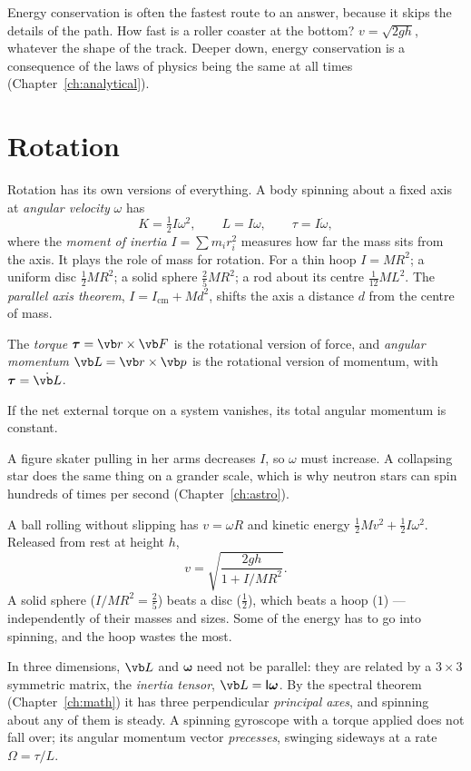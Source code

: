 Energy conservation is often the fastest route to an answer, because it skips the details of the path. How fast is a roller coaster at the bottom? $v = \sqrt{2gh}$, whatever the shape of the track. Deeper down, energy conservation is a consequence of the laws of physics being the same at all times (Chapter~\ref{ch:analytical}).

\section{Rotation}

Rotation has its own versions of everything. A body spinning about a fixed axis at \emph{angular velocity} $\omega$ has
\[
  K = \tfrac12 I\omega^{2},\qquad L = I\omega,\qquad \tau = I\dot\omega,
\]
where the \emph{moment of inertia} $I = \sum m_i r_i^2$ measures how far the mass sits from the axis. It plays the role of mass for rotation. For a thin hoop $I = MR^2$; a uniform disc $\tfrac12 MR^2$; a solid sphere $\tfrac25 MR^2$; a rod about its centre $\tfrac1{12}ML^2$. The \emph{parallel axis theorem}, $I = I_{\text{cm}} + Md^2$, shifts the axis a distance $d$ from the centre of mass.

The \emph{torque} $\boldsymbol\tau = \vb r\times\vb F$ is the rotational version of force, and \emph{angular momentum} $\vb L = \vb r\times\vb p$ is the rotational version of momentum, with $\boldsymbol\tau = \dot{\vb L}$.

\begin{law}
If the net external torque on a system vanishes, its total angular momentum is constant.
\end{law}

A figure skater pulling in her arms decreases $I$, so $\omega$ must increase. A collapsing star does the same thing on a grander scale, which is why neutron stars can spin hundreds of times per second (Chapter~\ref{ch:astro}).

\begin{example}[Rolling]
A ball rolling without slipping has $v = \omega R$ and kinetic energy $\tfrac12 Mv^2 + \tfrac12 I\omega^2$. Released from rest at height $h$,
\[
  v = \sqrt{\frac{2gh}{1 + I/MR^{2}}}.
\]
A solid sphere ($I/MR^2 = \tfrac25$) beats a disc ($\tfrac12$), which beats a hoop ($1$) --- independently of their masses and sizes. Some of the energy has to go into spinning, and the hoop wastes the most.
\end{example}

In three dimensions, $\vb L$ and $\boldsymbol\omega$ need not be parallel: they are related by a $3\times3$ symmetric matrix, the \emph{inertia tensor}, $\vb L = \mathsf{I}\boldsymbol\omega$. By the spectral theorem (Chapter~\ref{ch:math}) it has three perpendicular \emph{principal axes}, and spinning about any of them is steady. A spinning gyroscope with a torque applied does not fall over; its angular momentum vector \emph{precesses}, swinging sideways at a rate $\Omega = \tau/L$.

